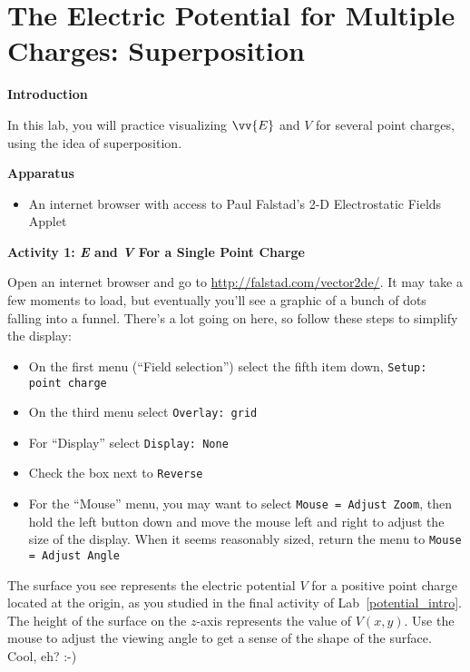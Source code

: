 \section{The Electric Potential for Multiple Charges: Superposition}
\label{potential_superposition}


\makelabheader %

\bigskip

\textbf{Introduction} 

In this lab, you will practice visualizing $\vv{E}$ and $V$ for several point charges, using the idea of superposition.

\textbf{Apparatus}

\begin{itemize}[nosep]
\item An internet browser with access to Paul Falstad's 2-D Electrostatic Fields Applet
\end{itemize}

\bigskip

\textbf{Activity 1: \textit{E} and \textit{V} For a Single Point Charge}

Open an internet browser and go to \href{http://falstad.com/vector2de/}{http://falstad.com/vector2de/}.  It may take a few moments to load, but eventually you'll see a graphic of a bunch of dots falling into a funnel.  There's a lot going on here, so follow these steps to simplify the display:
\begin{itemize}[nosep]
\item On the first menu (``Field selection'') select the fifth item down, \verb!Setup: point charge!
\item On the third menu select \verb!Overlay: grid!
\item For ``Display'' select \verb!Display: None!
\item Check the box next to \verb!Reverse!
\item For the ``Mouse'' menu, you may want to select \verb!Mouse = Adjust Zoom!, then hold the left button down and move the mouse left and right to adjust the size of the display.  When it seems reasonably sized, return the menu to \verb!Mouse = Adjust Angle!
\end{itemize}

The surface you see represents the electric potential $V$ for a positive point charge located at the origin, as you studied in the final activity of Lab~\ref{potential_intro}.  The height of the surface on the $z$-axis represents the value of $V(x,y)$.  Use the mouse to adjust the viewing angle to get a sense of the shape of the surface.  Cool, eh?  :-)

